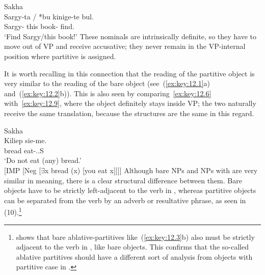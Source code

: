 \documentclass[output=paper]{langsci/langscibook}
\begin{document}
\ea\label{ex:key:12.8}Sakha\\
    \gll    \llap{*}Sargy-ta / *bu kinige-te  bul.\\
            Sargy-\Part{} {} \hphantom{*}this book-\Part{}  find.\Imp{}\\
    \glt    ‘Find Sargy/this book!’
\z
These nominals are intrinsically definite, so they have to move out of VP and
receive accusative; they never remain in the VP-internal position where
partitive is assigned.

It is worth recalling in this connection that the reading of the partitive
object is very similar to the reading of the bare object (see~(\ref{ex:key:12.1}a) and~(\ref{ex:key:12.2}b)).
This is also seen by comparing~\eqref{ex:key:12.6} with~\eqref{ex:key:12.9}, where the object definitely stays
inside VP; the two naturally receive the same  translation, because the
structures are the same in this regard.

\ea\label{ex:key:12.9}Sakha\\
	\gll    Kiliep  sie-me.\\
		    bread  eat-\Imp{}.\Neg{}.\Ssg{}S\\
	\glt    ‘Do not eat (any) bread.’\\
		    {}[IMP [Neg [${\exists}$x bread (x) [you eat x]]]]
\z
Although bare NPs and NPs with  are very similar in meaning,
there is a clear structural difference between them. Bare objects have to be
strictly left-adjacent to the verb in , whereas partitive objects can be
separated from the verb by an adverb or resultative phrase, as seen in
(10).\footnote{\textcite{Kornfilt1990,Kornfilt1996} shows that bare
    ablative-partitives like~(\ref{ex:key:12.3}b) also must be strictly adjacent to the verb in
    , like bare objects.  This confirms that the so-called ablative
partitives should have a different sort of analysis from objects with partitive
case in .}
\end{document}
